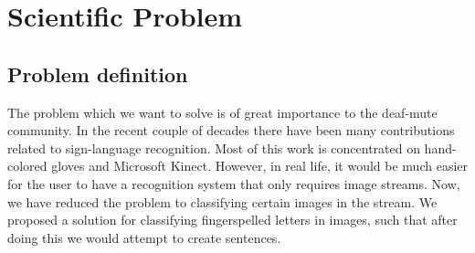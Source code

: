 \chapter{Scientific Problem}
\label{CapFT}

\section{Problem definition}
The problem which we want to solve is of great importance to the deaf-mute community.
\break
\break
In the recent couple of decades there have been many contributions related to sign-language recognition.
Most of this work is concentrated on hand-colored gloves and Microsoft Kinect. However, in real life, it would be much
easier for the user to have a recognition system that only requires image streams.
\break
\break
Now, we have reduced the problem to classifying certain images in the stream.
We proposed a solution for classifying fingerspelled letters in images, such that after doing this we would attempt
to create sentences.

